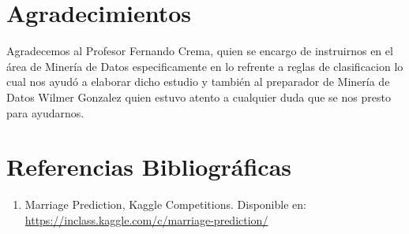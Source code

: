 \documentclass[twocolumn,showpacs,%
  nofootinbib,aps,superscriptaddress,%
  eqsecnum,prd,notitlepage,showkeys,10pt]{revtex4-1}
\begin{document}
\section{Agradecimientos}
Agradecemos al Profesor Fernando Crema, quien se encargo de instruirnos en el área de Minería de Datos especificamente en lo refrente a reglas de clasificacion lo cual nos ayudó a elaborar dicho estudio y también al preparador de Minería de Datos Wilmer Gonzalez quien estuvo atento a cualquier duda que se nos presto para ayudarnos.
    
\section{Referencias Bibliográficas}

\begin{enumerate}

	\item Marriage Prediction, Kaggle Competitions. Disponible en: \url{https://inclass.kaggle.com/c/marriage-prediction/}
    
\end{enumerate}
\end{document}
